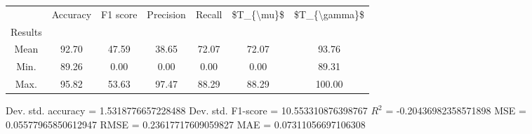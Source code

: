 \begin{tabular}{|c|c|c|c|c|c|c|}
\toprule
{} &  Accuracy &  F1 score &  Precision &  Recall &  \$T\_\{\textbackslash mu\}\$ &  \$T\_\{\textbackslash gamma\}\$ \\
Results &           &           &            &         &            &               \\
\hline
Mean    &     92.70 &     47.59 &      38.65 &   72.07 &      72.07 &         93.76 \\
Min.    &     89.26 &      0.00 &       0.00 &    0.00 &       0.00 &         89.31 \\
Max.    &     95.82 &     53.63 &      97.47 &   88.29 &      88.29 &        100.00 \\
\bottomrule
\end{tabular}

 Dev. std. accuracy = 1.5318776657228488
 Dev. std. F1-score = 10.553310876398767
 $R^2$ = -0.20436982358571898
 MSE = 0.05577965850612947
 RMSE = 0.23617717609059827
 MAE = 0.07311056697106308